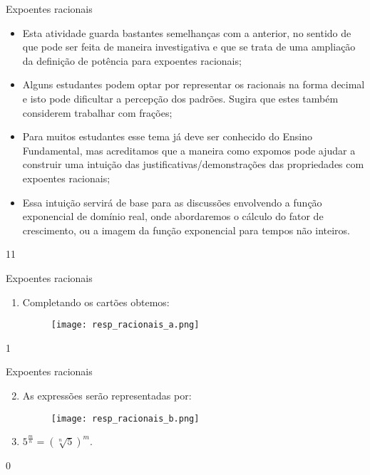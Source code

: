 \begin{sugestions}{Expoentes racionais}
{
\begin{itemize}

\item Esta atividade guarda bastantes semelhanças com a anterior, no sentido de que pode ser feita de maneira investigativa e que se trata de uma ampliação da definição de potência para expoentes racionais;

\item Alguns estudantes podem optar por representar os racionais na forma decimal e isto pode dificultar a percepção dos padrões. Sugira que estes também considerem trabalhar com frações;

\item Para muitos estudantes esse tema já deve ser conhecido do Ensino Fundamental, mas acreditamos que a maneira como expomos pode ajudar a construir uma intuição das justificativas/demonstrações das propriedades com expoentes racionais;

\item Essa intuição servirá de base para as discussões envolvendo a função exponencial de domínio real, onde abordaremos o cálculo do fator de crescimento, ou a imagem da função exponencial para tempos não inteiros.

\end{itemize}
}{1}{1}
\end{sugestions}
\begin{answer}{Expoentes racionais}
{
\begin{enumerate}

\item Completando os cartões obtemos:

\begin{figure}[H]
\centering
\noindent\texttt{[image: resp\_racionais\_a.png]}
\end{figure}
\end{enumerate}
}{1}
\end{answer}
\begin{answer}{Expoentes racionais}
{
\begin{enumerate}\setcounter{enumi}{1}
\item As expressões serão representadas por:

\begin{figure}[H]
\centering
\noindent\texttt{[image: resp\_racionais\_b.png]}
\end{figure}

\item $5^{\frac{m}{n}}=(\sqrt[n]{5})^{m}$.

\end{enumerate}
}{0}
\end{answer}

